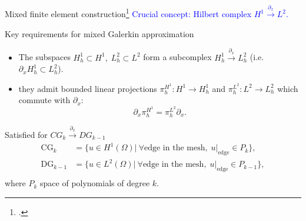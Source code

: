 \documentclass[serif]{beamer} %
\begin{document}
\begin{frame}{Mixed finite element construction\footcite{arnold2006acta}}
	\textcolor{blue}{Crucial concept: Hilbert complex $H^1 \xrightarrow{\partial_x} L^2$.} \\
	\begin{block}{Key requirements for mixed Galerkin approximation}
		
	\begin{itemize}
		\item The subspaces $H^1_h \subset H^1, \; L^2_h \subset L^2$ form a subcomplex $H^1_h \xrightarrow{\partial_x} L^2_h$ \hspace{1cm}(i.e. $\partial_x H^1_h \subset L^2_h$).
		\item they admit bounded linear projections $\pi_h^{H^1}: H^1 \rightarrow  
		H^1_h$  and $\pi_h^{L^2}: L^2 \rightarrow  
		L^2_h$ which commute with $\partial_x$:
		\vspace*{-\baselineskip}\vspace*{3pt}
		\[\partial_x \pi_h^{H^1} = \pi_h^{L^2} \partial_x.\]
	\end{itemize}
	\end{block}

	Satisfied for $CG_k \xrightarrow{\partial_x} DG_{k-1}$ 
	\begin{equation*}
		\begin{aligned}
			\mathrm{CG}_k &= \{u \in H^1(\Omega) | \: \forall \text{edge in the mesh}, \; u|_{\text{edge}} \in P_k\}, \\
			\mathrm{DG}_{k-1} &= \{u \in L^2(\Omega) | \: \forall \text{edge in the mesh}, \; u|_{\text{edge}} \in P_{k-1}\}, \\
		\end{aligned}
	\end{equation*}
	where $P_k$ space of polynomials of degree $k$.
	\vspace{.1cm}
\end{frame}
\end{document}
